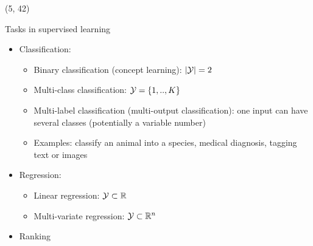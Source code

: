 \begin{frame}
  \begin{textblock}{90}(5, 42)
    \begin{block}{Tasks in supervised learning}
      \begin{itemize}
      \item<2-> Classification:
        \begin{itemize}
        \item Binary classification (concept learning): $\left | \mathcal{Y} \right | = 2$
        \item Multi-class classification: $\mathcal{Y} = \left \lbrace {1,..,K} \right \rbrace$
        \item Multi-label classification (multi-output classification): one input can have
        several classes (potentially a variable number)
        \item Examples: classify an animal into a species, medical diagnosis, tagging text or images
        \end{itemize}
      \item<3-> Regression:
        \begin{itemize}
        \item Linear regression: $\mathcal{Y} \subset \mathbb{R}$
        \item Multi-variate regression: $\mathcal{Y} \subset \mathbb{R}^n$
        \end{itemize}
      \item<4-> Ranking
      \end{itemize}
    \end{block}
  \end{textblock}
\end{frame}




